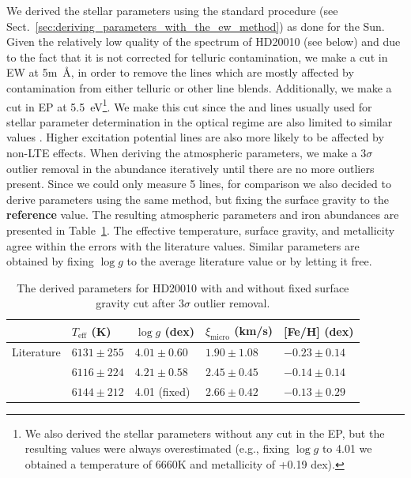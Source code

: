 \documentclass{aa}
\begin{document}
We derived the stellar parameters using the standard procedure (see
Sect.~\ref{sec:deriving_parameters_with_the_ew_method}) as done for
the Sun. Given the relatively low quality of the spectrum of HD20010
(see below) and due to the fact that it is not corrected for telluric
contamination, we make a cut in EW at 5\si{m\angstrom}, in order to
remove the lines which are mostly affected by contamination from either
telluric or other line blends. Additionally, we make a cut in EP at
\SI{5.5}{eV}\footnote{We also derived the stellar parameters without
any cut in the EP, but the resulting values were always overestimated
(e.g., fixing $\log g$ to 4.01 we obtained a temperature of 6660K and
metallicity of +0.19 dex).}. We make this cut since the  and
 lines usually used for stellar parameter determination
in the optical regime are also limited to similar values \citep[see
e.g.][]{Sousa2008a}. Higher excitation potential lines are also more
likely to be affected by non-LTE effects. When deriving the atmospheric
parameters, we make a $3\sigma$ outlier removal in the abundance
iteratively until there are no more outliers present. Since we could
only measure 5  lines, for comparison we also decided to
derive parameters using the same method, but fixing the surface gravity
to the \textbf{reference} value. The resulting atmospheric parameters
and iron abundances are presented in Table~\ref{tab:hd20010}. The
effective temperature, surface gravity, and metallicity agree within the
errors with the literature values. Similar parameters are obtained by
fixing $\log g$ to the average literature value or by letting it free.

\begin{table}[htb!]
    \caption{The derived parameters for HD20010 with and without
    fixed surface gravity cut after 3$\sigma$ outlier removal.}
    \label{tab:hd20010}
    \centering
    \begin{tabular}{lllll}
      \hline\hline
                     & $T_\mathrm{eff}$ (K) &  $\log g$ (dex)  &   $\xi_\mathrm{micro}$ (km/s)  & [Fe/H] (dex)      \\
      \hline
        Literature   & $6131 \pm 255$       &  $4.01 \pm 0.60$ &    $1.90 \pm 1.08$              & $-0.23 \pm 0.14$ \\
      \hline
                     & $6116 \pm 224$       &  $4.21 \pm 0.58$ &    $2.45 \pm 0.45$              & $-0.14 \pm 0.14$ \\
                     & $6144 \pm 212$       &   4.01 (fixed)   &    $2.66 \pm 0.42$              & $-0.13 \pm 0.29$ \\
      \hline
    \end{tabular}
\end{table}
\end{document}
